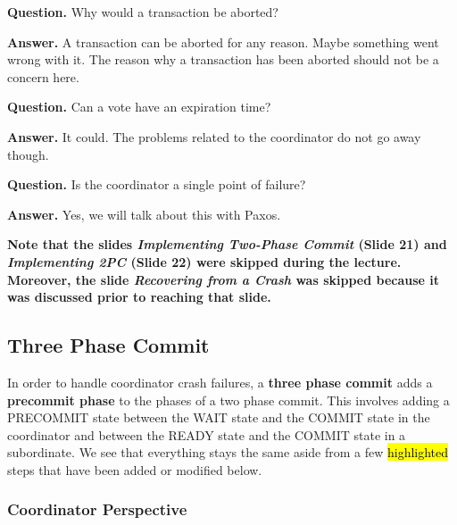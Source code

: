 \documentclass[twoside]{article}
\begin{document}
\textbf{Question.} Why would a transaction be aborted?

\textbf{Answer.} A transaction can be aborted for any reason. Maybe something went wrong with it. The reason why a transaction has been aborted should not be a concern here. 

\textbf{Question.} Can a vote have an expiration time?

\textbf{Answer.} It could. The problems related to the coordinator do not go away though.

\textbf{Question.} Is the coordinator a single point of failure?

\textbf{Answer.} Yes, we will talk about this with Paxos.

\textbf{Note that the slides \emph{Implementing Two-Phase Commit} (Slide 21) and \emph{Implementing 2PC} (Slide 22) were skipped during the lecture. Moreover, the slide \emph{Recovering from a Crash} was skipped because it was discussed prior to reaching that slide.}

\subsection{Three Phase Commit}

In order to handle coordinator crash failures, a \textbf{three phase commit} adds a \textbf{precommit phase} to the phases of a two phase commit. This involves adding a {\ttfamily PRECOMMIT} state between the {\ttfamily WAIT} state and the {\ttfamily COMMIT} state in the coordinator and between the {\ttfamily READY} state and the {\ttfamily COMMIT} state in a subordinate. We see that everything stays the same aside from a few \hl{highlighted} steps that have been added or modified below.

\subsubsection{Coordinator Perspective}
\end{document}
